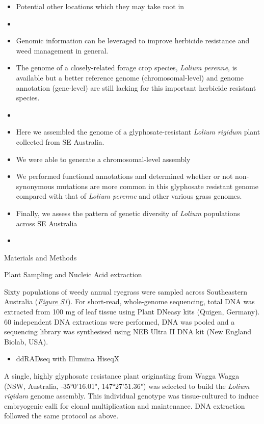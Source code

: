 \begin{itemize}
\tightlist
\item
  Potential other locations which they may take root in
\item
\item
  Genomic information can be leveraged to improve herbicide resistance
  and weed management in general.
\item
  The genome of a closely-related forage crop species, \emph{Lolium
  perenne}, is available but a better reference genome
  (chromosomal-level) and genome annotation (gene-level) are still
  lacking for this important herbicide resistant species.
\item
\item
  Here we assembled the genome of a glyphosate-resistant \emph{Lolium
  rigidum} plant collected from SE Australia.
\item
  We were able to generate a chromosomal-level assembly
\item
  We performed functional annotations and determined whether or not
  non-synonymous mutations are more common in this glyphosate resistant
  genome compared with that of \emph{Lolium perenne} and other various
  grass genomes.
\item
  Finally, we assess the pattern of genetic diversity of \emph{Lolium}
  populations across SE Australia
\item
\end{itemize}

\protect\hypertarget{anchor-4}{}{}Materials and Methods

\protect\hypertarget{anchor-5}{}{}Plant Sampling and Nucleic Acid
extraction

Sixty populations of weedy annual ryegrass were sampled across
Southeastern Australia (\protect\hyperlink{xpuavhcd9n22}{\emph{Figure
}}\protect\hyperlink{xpuavhcd9n22}{\emph{S1}}). For short-read,
whole-genome sequencing, total DNA was extracted from 100 mg of leaf
tissue using Plant DNeasy kits (Quigen, Germany). 60 independent DNA
extractions were performed, DNA was pooled and a sequencing library was
synthesised using NEB Ultra II DNA kit (New England Biolab, USA).

\begin{itemize}
\tightlist
\item
  ddRADseq with Illumina HiseqX
\end{itemize}

A single, highly glyphosate resistance plant originating from Wagga
Wagga (NSW, Australia, -35°0'16.01", 147°27'51.36") was selected to
build the \emph{Lolium rigidum} genome assembly. This individual
genotype was tissue-cultured to induce embryogenic calli for clonal
multiplication and maintenance. DNA extraction followed the same
protocol as above.

